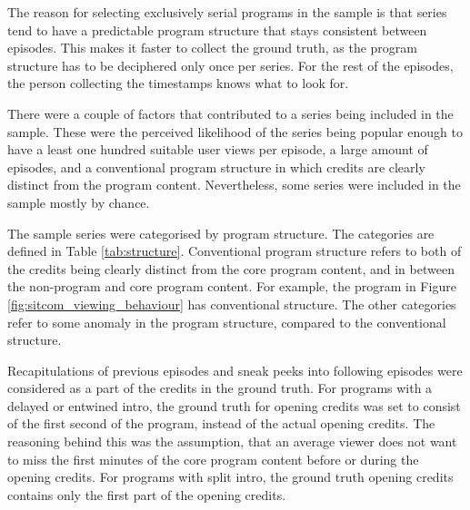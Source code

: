 The reason for selecting exclusively serial programs in the sample is that series tend to have a predictable program structure that stays consistent between episodes. This makes it faster to collect the ground truth, as the program structure has to be deciphered only once per series. For the rest of the episodes, the person collecting the timestamps knows what to look for.

There were a couple of factors that contributed to a series being included in the sample. These were the perceived likelihood of the series being popular enough to have a least one hundred suitable user views per episode, a large amount of episodes, and a conventional program structure in which credits are clearly distinct from the program content. Nevertheless, some series were included in the sample mostly by chance.

The sample series were categorised by program structure. The categories are defined in Table \ref{tab:structure}. Conventional program structure refers to both of the credits being clearly distinct from the core program content, and in between the non-program and core program content. For example, the program in Figure \ref{fig:sitcom_viewing_behaviour} has conventional structure. The other categories refer to some anomaly in the program structure, compared to the conventional structure.

Recapitulations of previous episodes and sneak peeks into following episodes were considered as a part of the credits in the ground truth. For programs with a delayed or entwined intro, the ground truth for opening credits was set to consist of the first second of the program, instead of the actual opening credits. The reasoning behind this was the assumption, that an average viewer does not want to miss the first minutes of the core program content before or during the opening credits. For programs with split intro, the ground truth opening credits contains only the first part of the opening credits.

